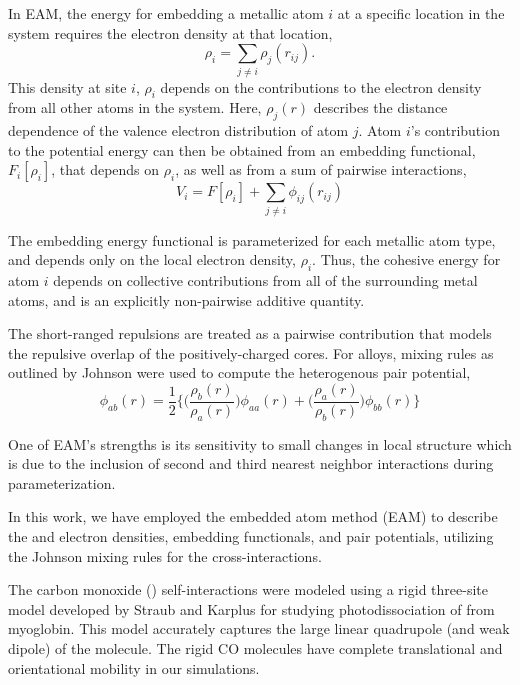 \documentclass[journal = jpccck, manuscript = article]{achemso}
\begin{document}
In EAM, the energy for embedding a metallic atom $i$ at a specific
location in the system requires the electron density at that location,
\begin{equation*}
\rho_i = \sum_{j\neq i} \rho_j(r_{ij}).
\end{equation*}
This density at site $i$, $\rho_i$ depends on the contributions to the
electron density from all other atoms in the system.  Here,
$\rho_j(r)$ describes the distance dependence of the valence electron
distribution of atom $j$.  Atom $i$'s contribution to the potential
energy can then be obtained from an embedding functional, $F_i\left[
  \rho_i \right]$, that depends on $\rho_i$, as well as from a sum of
pairwise interactions,
\begin{equation*}
  V_i =  F[ \rho_i ]  + \sum_{j \neq i} \phi_{ij}(r_{ij})
\end{equation*}

The embedding energy functional is parameterized for each metallic
atom type, and depends only on the local electron density, $\rho_i$.
Thus, the cohesive energy for atom $i$ depends on collective
contributions from all of the surrounding metal atoms, and is an
explicitly non-pairwise additive quantity.

The short-ranged repulsions are treated as a pairwise contribution
that models the repulsive overlap of the positively-charged cores.
For alloys, mixing rules as outlined by Johnson \cite{johnson89} were
used to compute the heterogenous pair potential,
\begin{equation*} 
\phi_{ab}(r) = \frac{1}{2}
\bigg\{ \bigg(
\frac{\rho_b(r)}{\rho_a(r)}
\bigg) \phi_{aa}(r)
+ \bigg(
\frac{\rho_a(r)}{\rho_b(r)}
\bigg)\phi_{bb}(r) 
\bigg\}
\end{equation*} 

One of EAM's strengths is its sensitivity to small changes in local
structure which is due to the inclusion of second and third nearest
neighbor interactions during parameterization.\cite{Voter:1995fk}

In this work, we have employed the embedded atom method (EAM) to
describe the  and  electron densities, embedding
functionals, and pair potentials,\cite{EAM} utilizing the Johnson
mixing rules for the 
cross-interactions.\cite{johnson89}

The carbon monoxide () self-interactions were modeled using a
rigid three-site model developed by Straub and Karplus for studying
photodissociation of  from myoglobin.\cite{Straub} This model
accurately captures the large linear quadrupole (and weak dipole) of
the  molecule. The rigid CO molecules have complete
translational and orientational mobility in our simulations.
\end{document}
